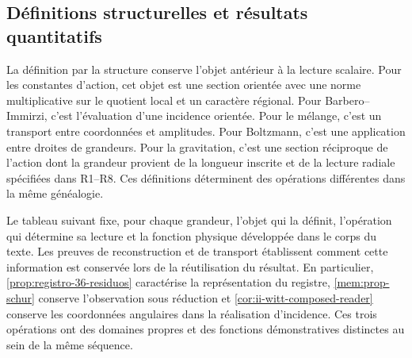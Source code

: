 \subsection{Définitions structurelles et résultats quantitatifs}
\label{sec:ii-conclusiones-cuantitativas}

La définition par la structure conserve l’objet antérieur à la lecture
scalaire. Pour les constantes d’action, cet objet est une section orientée
avec une norme multiplicative sur le quotient local et un caractère régional.
Pour Barbero--Immirzi, c’est
l’évaluation d’une incidence orientée. Pour le mélange, c’est un transport
entre coordonnées et amplitudes. Pour Boltzmann, c’est une application entre
droites de grandeurs. Pour la gravitation, c’est une section réciproque de
l’action dont la grandeur provient de la longueur inscrite et de la lecture
radiale spécifiées dans R1--R8. Ces définitions
déterminent des opérations différentes dans la même généalogie.

Le tableau suivant fixe, pour chaque grandeur, l’objet qui la définit,
l’opération qui détermine sa lecture et la fonction physique développée
dans le corps du texte. Les preuves de reconstruction et de transport établissent
comment cette information est conservée lors de la réutilisation du résultat. En
particulier, \ref{prop:registro-36-residuos} caractérise la représentation
du registre, \ref{mem:prop-schur} conserve l’observation sous réduction
et \ref{cor:ii-witt-composed-reader} conserve les coordonnées angulaires
dans la réalisation d’incidence. Ces trois opérations ont des domaines
propres et des fonctions démonstratives distinctes au sein de la même séquence.

